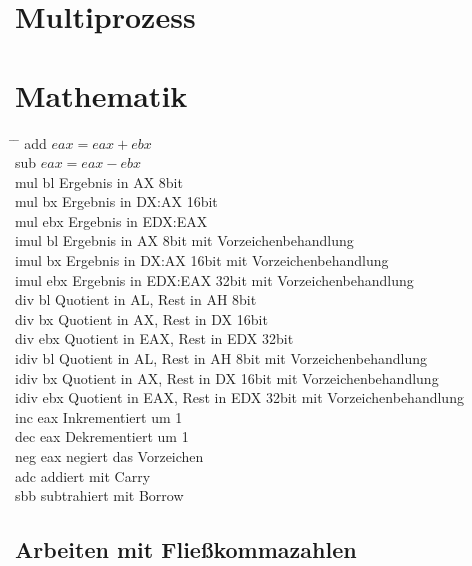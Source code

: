 \documentclass[a4paper,12pt,twoside]{article}
\begin{document}
\section{Multiprozess}
\section{Mathematik}
\begin{tabbing}
  \hspace{2mm} \= \hspace{50mm} \= \kill 
  \> add \> $eax = eax + ebx$ \\ 
  \> sub \> $eax = eax - ebx$ \\ 
  \> mul bl \> Ergebnis in AX 8bit \\ 
  \> mul bx \> Ergebnis in DX:AX 16bit \\ 
  \> mul ebx \> Ergebnis in EDX:EAX \\ 
  \> imul bl \> Ergebnis in AX 8bit mit Vorzeichenbehandlung \\ 
  \> imul bx \> Ergebnis in DX:AX 16bit mit Vorzeichenbehandlung \\ 
  \> imul ebx \> Ergebnis in EDX:EAX 32bit mit Vorzeichenbehandlung \\
  \> div bl \> Quotient in AL, Rest in AH 8bit \\ 
  \> div bx \> Quotient in AX, Rest in DX 16bit \\ 
  \> div ebx \> Quotient in EAX, Rest in EDX 32bit \\
  \> idiv bl \> Quotient in AL, Rest in AH 8bit mit Vorzeichenbehandlung \\ 
  \> idiv bx \> Quotient in AX, Rest in DX 16bit mit Vorzeichenbehandlung \\ 
  \> idiv ebx \> Quotient in EAX, Rest in EDX 32bit mit Vorzeichenbehandlung \\
  \> inc eax \> Inkrementiert um 1 \\ 
  \> dec eax \> Dekrementiert um 1 \\
  \> neg eax \> negiert das Vorzeichen \\ 
  \> adc \> addiert mit Carry \\ 
  \> sbb \> subtrahiert mit Borrow \\
\end{tabbing}
\subsection{Arbeiten mit Fließkommazahlen}
\end{document}
